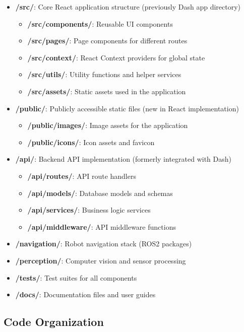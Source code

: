 \documentclass[12pt]{article}
\begin{document}
\begin{itemize}
    \item \textbf{/src/}: Core React application structure (previously Dash app directory)
    \begin{itemize}
        \item \textbf{/src/components/}: Reusable UI components
        \item \textbf{/src/pages/}: Page components for different routes
        \item \textbf{/src/context/}: React Context providers for global state
        \item \textbf{/src/utils/}: Utility functions and helper services
        \item \textbf{/src/assets/}: Static assets used in the application
    \end{itemize}
    \item \textbf{/public/}: Publicly accessible static files (new in React implementation)
    \begin{itemize}
        \item \textbf{/public/images/}: Image assets for the application
        \item \textbf{/public/icons/}: Icon assets and favicon
    \end{itemize}
    \item \textbf{/api/}: Backend API implementation (formerly integrated with Dash)
    \begin{itemize}
        \item \textbf{/api/routes/}: API route handlers
        \item \textbf{/api/models/}: Database models and schemas
        \item \textbf{/api/services/}: Business logic services
        \item \textbf{/api/middleware/}: API middleware functions
    \end{itemize}
    \item \textbf{/navigation/}: Robot navigation stack (ROS2 packages)
    \item \textbf{/perception/}: Computer vision and sensor processing
    \item \textbf{/tests/}: Test suites for all components
    \item \textbf{/docs/}: Documentation files and user guides
\end{itemize}

\subsection{Code Organization}
\end{document}
